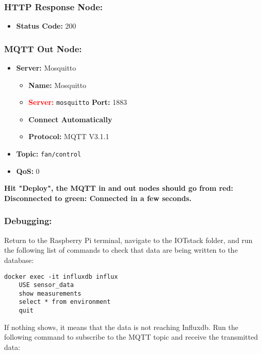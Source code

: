 \documentclass[onecolumn]{article}
\begin{document}
\subsubsection*{HTTP Response Node:}

\begin{itemize}
  \item \textbf{Status Code:} 200
\end{itemize}

\subsubsection*{MQTT Out Node:}

\begin{itemize}
  \item \textbf{Server:} Mosquitto
  \begin{itemize}
      \item \textbf{Name:} Mosquitto
      \item \textcolor{red}{\textbf{Server:}} \texttt{mosquitto}  \textbf{Port:} 1883
      \item \textbf{Connect Automatically}
      \item \textbf{Protocol:} MQTT V3.1.1
  \end{itemize}
  \item \textbf{Topic:} \texttt{fan/control}
  \item \textbf{QoS:} 0
\end{itemize}

\vspace{1cm}

\textbf{Hit "Deploy", the MQTT in and out nodes should go from red: Disconnected to green: Connected in a few seconds.}

\subsubsection{Debugging:}

Return to the Raspberry Pi terminal, navigate to the IOTstack folder, and run the following list of commands to check that data are being written to the database:
\label{influxdebug}

\begin{lstlisting}[numbers=none]
    docker exec -it influxdb influx
    USE sensor_data
    show measurements
    select * from environment
    quit
\end{lstlisting}

If nothing shows, it means that the data is not reaching Influxdb. Run the following command to subscribe to the MQTT topic and receive the transmitted data:
\end{document}
